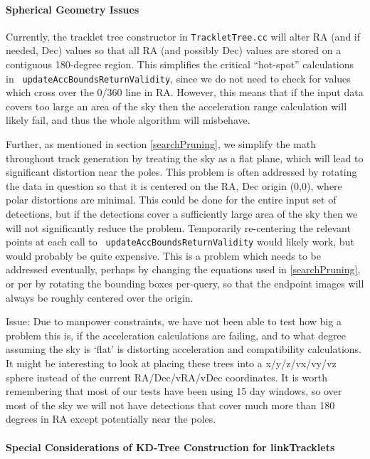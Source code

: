 \paragraph{Spherical Geometry Issues}
Currently, the tracklet tree constructor in {\tt TrackletTree.cc} will
alter RA (and if needed, Dec) values so that all RA (and possibly Dec)
values are stored on a contiguous 180-degree region.  This simplifies
the critical ``hot-spot'' calculations in {\tt
  updateAccBoundsReturnValidity}, since we do not need to check for
values which cross over the 0/360 line in RA.  However, this means
that if the input data covers too large an area of the sky then the
acceleration range calculation will likely fail, and thus the whole
algorithm will misbehave.

Further, as mentioned in section \ref{searchPruning}, we simplify the
math throughout track generation by treating the sky as a flat plane,
which will lead to significant distortion near the poles.  This
problem is often addressed by rotating the data in question so that it
is centered on the RA, Dec origin (0,0), where polar distortions are
minimal.  This could be done for the entire input set of detections,
but if the detections cover a sufficiently large area of the sky then
we will not significantly reduce the problem.  Temporarily
re-centering the relevant points at each call to {\tt
  updateAccBoundsReturnValidity} would likely work, but would probably
be quite expensive.  This is a problem which needs to be addressed
eventually, perhaps by changing the equations used in
\ref{searchPruning}, or per by rotating the bounding boxes per-query,
so that the endpoint images will always be roughly centered over the
origin.

Issue: Due to manpower constraints, we have not been able to test how big a problem this is, if
the acceleration calculations are failing, and to what degree assuming
the sky is `flat' is distorting acceleration and compatibility
calculations.  It might be interesting to look at placing these trees
into a x/y/z/vx/vy/vz sphere instead of the current RA/Dec/vRA/vDec
coordinates. It is worth remembering that most of our tests have been
using 15 day windows, so over most of the sky we will not have
detections that cover much more than 180 degrees in RA except
potentially near the poles. 


\paragraph{Special Considerations of KD-Tree Construction for linkTracklets} 

